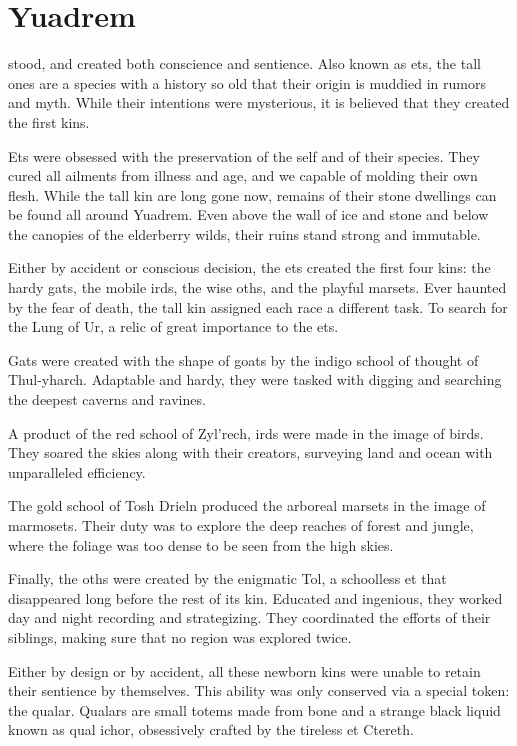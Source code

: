 \chapter{Yuadrem}
\begin{linenumbers}
stood, and created both conscience and sentience.
Also known as ets, the tall ones are a species with a history so old that their origin is muddied in rumors and myth.
While their intentions were mysterious, it is believed that they created the first kins.

Ets were obsessed with the preservation of the self and of their species.
They cured all ailments from illness and age, and we capable of molding their own flesh.
While the tall kin are long gone now, remains of their stone dwellings can be found all around Yuadrem.
Even above the wall of ice and stone and below the canopies of the elderberry wilds, their ruins stand strong and immutable.

Either by accident or conscious decision, the ets created the first four kins: the hardy gats, the mobile irds, the wise oths, and the playful marsets.
Ever haunted by the fear of death, the tall kin assigned each race a different task.
To search for the Lung of Ur, a relic of great importance to the ets.

Gats were created with the shape of goats by the indigo school of thought of Thul-yharch.
Adaptable and hardy, they were tasked with digging and searching the deepest caverns and ravines.

A product of the red school of Zyl'rech, irds were made in the image of birds.
They soared the skies along with their creators, surveying land and ocean with unparalleled efficiency.

The gold school of Tosh Drieln produced the arboreal marsets in the image of marmosets.
Their duty was to explore the deep reaches of forest and jungle, where the foliage was too dense to be seen from the high skies.

Finally, the oths were created by the enigmatic Tol, a schoolless et that disappeared long before the rest of its kin.
Educated and ingenious, they worked day and night recording and strategizing.
They coordinated the efforts of their siblings, making sure that no region was explored twice.

Either by design or by accident, all these newborn kins were unable to retain their sentience by themselves.
This ability was only conserved via a special token: the qualar.
Qualars are small totems made from bone and a strange black liquid known as qual ichor, obsessively crafted by the tireless et Ctereth.


\end{linenumbers}
